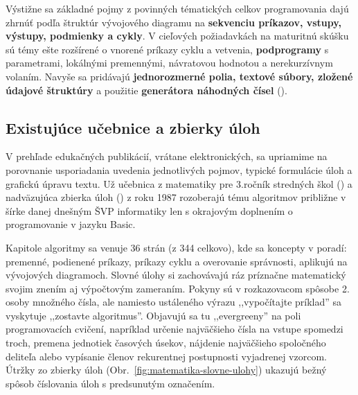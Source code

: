 Výstižne sa základné pojmy z povinných tématických celkov programovania dajú zhrnúť podľa štruktúr vývojového diagramu na \textbf{sekvenciu príkazov, vstupy, výstupy, podmienky a cykly}. V cieľových požiadavkách na maturitnú skúšku sú témy ešte rozšírené o vnorené príkazy cyklu a vetvenia, \textbf{podprogramy} s parametrami, lokálnými premennými, návratovou hodnotou a nerekurzívnym volaním. Navyše sa pridávajú \textbf{jednorozmerné polia, textové súbory, zložené údajové štruktúry} a použitie \textbf{generátora náhodných čísel} (\cite{cp_2023}).

\subsection{Existujúce učebnice a zbierky úloh}
V prehľade edukačných publikácií, vrátane elektronických, sa upriamime na porovnanie usporiadania uvedenia jednotlivých pojmov, typické formulácie úloh a grafickú úpravu textu. Už učebnica z matematiky pre 3.ročník stredných škol (\cite{sedivy_matematika_1986}) a nadväzujúca zbierka úloh (\cite{busek_zbierka_1987}) z roku 1987 rozoberajú tému algoritmov približne v šírke danej dnešným ŠVP informatiky len s okrajovým doplnením o programovanie v jazyku Basic. 

Kapitole algoritmy sa venuje 36 strán (z 344 celkovo), kde sa koncepty v poradí: premenné, podienené príkazy, príkazy cyklu a overovanie správnosti, aplikujú na vývojových diagramoch. Slovné úlohy si zachovávajú ráz príznačne matematický svojim znením  aj výpočtovým zameraním. Pokyny sú v rozkazovacom spôsobe 2. osoby množného čísla, ale namiesto ustáleného výrazu ,,vypočítajte príklad'' sa vyskytuje ,,zostavte algoritmus''. Objavujú sa tu ,,evergreeny'' na poli programovacích cvičení, napríklad určenie najväčšieho čísla na vstupe spomedzi troch, premena jednotiek časových úsekov, nájdenie najväčšieho spoločného deliteľa alebo vypísanie členov rekurentnej postupnosti vyjadrenej vzorcom. Útržky zo zbierky úloh (Obr.~\ref{fig:matematika-slovne-ulohy}) ukazujú bežný spôsob číslovania úloh s predsunutým označením.

